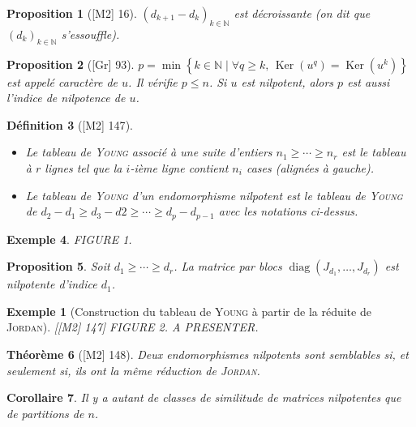 \documentclass[10pt, a4paper, parskip=full, twoside, twocolumn]{report}
\newtheorem{definition}{Définition}
\newtheorem{theorem}[definition]{Théorème}
\newtheorem{proposition}[definition]{Proposition}
\newtheorem{corollary}[definition]{Corollaire}
\newtheorem{example}[definition]{Exemple}
\newtheorem*{example*}{Exemple}
\newcommand{\IN}{\mathbb{N}}
\DeclareMathOperator{\Ker}{Ker}
\DeclareMathOperator{\diag}{diag}
\begin{document}
\begin{proposition}[\textnormal{[M2] 16}]
	$\left(d_{k+1}-d_k\right)_{k\in\IN}$ est décroissante (on dit que $\left(d_k\right)_{k\in\IN}$ \emph{s'essouffle}).
\end{proposition}

\begin{proposition}[\textnormal{[Gr] 93}]
	$p=\min\left\{k\in \IN\mid \forall q\geq k,\, \Ker(u^q)=\Ker(u^k)\right\}$ est appelé \emph{caractère de $u$}.
	Il vérifie $p\leq n$. Si $u$ est nilpotent, alors $p$ est aussi l'indice de nilpotence de $u$.
\end{proposition}

\begin{definition}[\textnormal{[M2] 147}]
	\begin{itemize}
		\item Le \emph{tableau de \textsc{Young}} associé à une suite d'entiers $n_1\geq \cdots \geq n_r$ est le tableau à $r$ lignes tel que la $i$-ième ligne contient $n_i$ cases (alignées à gauche).
		\item Le \emph{tableau de \textsc{Young}} d'un endomorphisme nilpotent est le tableau de \textsc{Young} de $d_2-d_1\geq d_3-d2\geq \cdots \geq d_p - d_{p-1}$ avec les notations ci-dessus.
	\end{itemize}
\end{definition}

\begin{example}
	FIGURE 1.
\end{example}

\begin{proposition}
	Soit $d_1\geq \cdots\geq d_r$. La matrice par blocs $\diag(J_{d_1},\dots,J_{d_r})$ est nilpotente d'indice $d_1$.
\end{proposition}

\begin{example*}[Construction du tableau de \textsc{Young} à partir de la réduite de \textsc{Jordan}]
	[\textnormal{[M2] 147}]
	FIGURE 2. A PRESENTER.
\end{example*}

\begin{theorem}[\textnormal{[M2] 148}]
	Deux endomorphismes nilpotents sont semblables si, et seulement si, ils ont la même réduction de \textsc{Jordan}.
\end{theorem}

\begin{corollary}
	Il y a autant de classes de similitude de matrices nilpotentes que de partitions de $n$.
\end{corollary}
\end{document}
